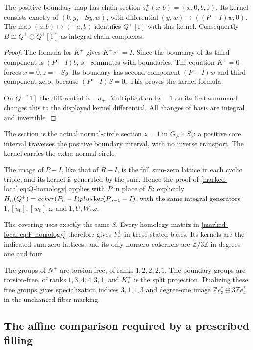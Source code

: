\begin{proposition}\label{marked-local:prop:positive-splitting}
The positive boundary map has chain section
$s^+_n(x,b)=(x,0,b,0)$. Its kernel consists exactly of
$(0,y,-Sy,w)$, with differential $(y,w)\mapsto((P-I)w,0)$.
The map $(a,b)\mapsto(-a,b)$ identifies $Q^+[1]$ with this kernel.
Consequently $B\cong Q^+\oplus Q^+[1]$ as integral chain complexes.
\end{proposition}

\begin{proof}
The formula for $K^+$ gives $K^+s^+=I$. Since the boundary of
its third component is $(P-I)b$, $s^+$ commutes with boundaries.
The equation $K^+=0$ forces $x=0,z=-Sy$. Its boundary has
second component $(P-I)w$ and third component zero, because
$(P-I)S=0$. This proves the kernel formula.

On $Q^+[1]$ the
differential is $-d_+$. Multiplication by $-1$ on its first
summand changes this to the displayed kernel differential.
All changes of basis are integral and invertible.
\end{proof}

The section is the actual normal-circle section $z=1$ in
$G_P\times S^1_z$: a positive core interval traverses the positive
boundary interval, with no inverse transport. The kernel carries
the extra normal circle.

The image of $P-I$, like that of $R-I$,
is the full sum-zero lattice in each cyclic triple, and its kernel
is generated by the sum. Hence the proof of
\eqref{marked-local:eq:Q-homology} applies with $P$ in place of $R$: explicitly
$H_n(Q^+)=coker(P_n-I)plus\ker(P_{n-1}-I)$, with the same
integral generators $1,[u_0],[w_0],\omega$ and $1,U,W,\omega$.

The covering uses exactly the same $S$. Every homology matrix in
\eqref{marked-local:eq:F-homology} therefore gives $F^+_*$ in these stated bases.
Its kernels are the indicated sum-zero lattices, and its only
nonzero cokernels are $\mathbb Z/3\mathbb Z$ in degrees one and four.

The groups of $N^+$ are torsion-free, of ranks $1,2,2,2,1$.
The boundary groups are torsion-free, of ranks $1,3,4,4,3,1$,
and $K^+_*$ is the split projection. Dualizing these free groups
gives specialization indices $3,1,1,3$ and degree-one image
$\mathbb Ze_3^*\oplus3\mathbb Ze_4^*$ in the unchanged fiber marking.

\subsection{The affine comparison required by a prescribed filling}

